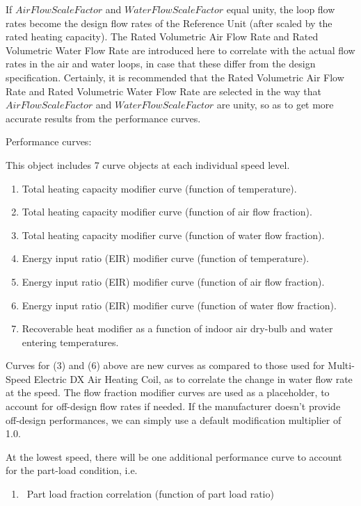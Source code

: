 If \(AirFlowScaleFactor\) and \(WaterFlowScaleFactor\) equal unity, the loop flow rates become the design flow rates of the Reference Unit (after scaled by the rated heating capacity). The Rated Volumetric Air Flow Rate and Rated Volumetric Water Flow Rate are introduced here to correlate with the actual flow rates in the air and water loops, in case that these differ from the design specification. Certainly, it is recommended that the Rated Volumetric Air Flow Rate and Rated Volumetric Water Flow Rate are selected in the way that \(AirFlowScaleFactor\) and \(WaterFlowScaleFactor\) are unity, so as to get more accurate results from the performance curves.

Performance curves:

This object includes 7 curve objects at each individual speed level.

\begin{enumerate}
\def\labelenumi{\arabic{enumi})}
\item Total heating capacity modifier curve (function of temperature).
\item Total heating capacity modifier curve (function of air flow fraction).
\item Total heating capacity modifier curve (function of water flow fraction).
\item Energy input ratio (EIR) modifier curve (function of temperature).
\item Energy input ratio (EIR) modifier curve (function of air flow fraction).
\item Energy input ratio (EIR) modifier curve (function of water flow fraction).
\item Recoverable heat modifier as a function of indoor air dry-bulb and water entering temperatures.
\end{enumerate}

Curves for (3) and (6) above are new curves as compared to those used for Multi-Speed Electric DX Air Heating Coil, as to correlate the change in water flow rate at the speed. The flow fraction modifier curves are used as a placeholder, to account for off-design flow rates if needed. If the manufacturer doesn't provide off-design performances, we can simply use a default modification multiplier of 1.0.

At the lowest speed, there will be one additional performance curve to account for the part-load condition, i.e.

\begin{enumerate}
\def\labelenumi{\arabic{enumi})}
\setcounter{enumi}{7}
\item
  ~Part load fraction correlation (function of part load ratio)
\end{enumerate}

